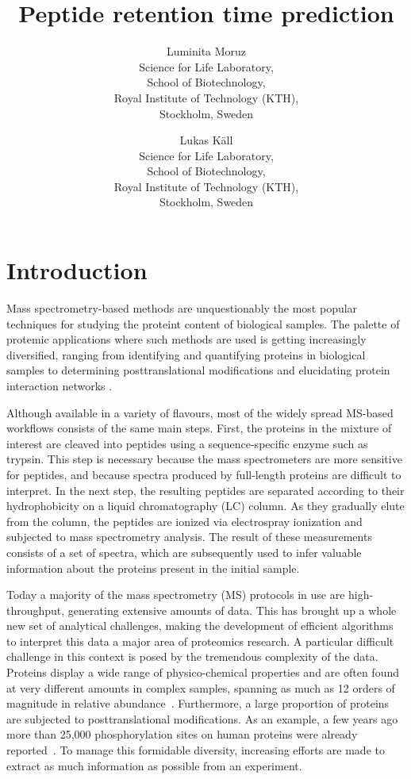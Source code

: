 \documentclass[a4paper]{article}
\title{Peptide retention time prediction}
\author{
Luminita Moruz\\
Science for Life Laboratory,\\
School of Biotechnology,\\
Royal Institute of Technology (KTH),\\
Stockholm, Sweden
\and
Lukas K\"all\\
Science for Life Laboratory,\\
School of Biotechnology,\\
Royal Institute of Technology (KTH),\\
Stockholm, Sweden}
\begin{document}
\maketitle

\setcounter{secnumdepth}{2} %
\setcounter{tocdepth}{2}    %
\tableofcontents            %

\setlength{\parskip}{0.15cm}

\section{Introduction}

Mass spectrometry-based methods are unquestionably the most popular
techniques for studying the proteint content of biological samples.
The palette of protemic applications where such methods are used is
getting increasingly diversified, ranging from identifying and
quantifying proteins in biological samples \cite{Geiger2012} to
determining posttranslational modifications \cite{Huttlin2010} and
elucidating protein interaction networks \cite{Gavin2011}. 


Although available in a variety of flavours, most of the widely spread MS-based workflows consists of the same main steps. First, the proteins in the mixture of interest are cleaved into peptides using a sequence-specific enzyme such as trypsin. This step is necessary because the mass spectrometers are more sensitive for peptides, and because spectra produced by full-length proteins are difficult to interpret. In the next step, the resulting peptides are separated according to their hydrophobicity on a liquid chromatography (LC) column. As they gradually elute from the column, the peptides are ionized via electrospray ionization and subjected to mass spectrometry analysis. The result of these measurements consists of a set of spectra, which are subsequently used to infer valuable information about the proteins present in the initial sample.


Today a majority of the mass spectrometry (MS) protocols in use are
high-throughput, generating extensive amounts of data. This has
brought up a whole new set of analytical challenges, making the
development of efficient algorithms to interpret this data a major
area of proteomics research. A particular difficult challenge in this
context is posed by the tremendous complexity of the data. Proteins
display a wide range of physico-chemical properties and are often
found at very different amounts in complex samples, spanning as much
as 12 orders of magnitude in relative abundance~\cite{Angel2012}.
Furthermore, a large proportion of proteins are subjected to
posttranslational modifications. As an example, a few years ago more
than 25,000 phosphorylation sites on human proteins were already
reported~\cite{Lemeer2009}. To manage this formidable diversity,
increasing efforts are made to extract as much information as possible
from an experiment.
\end{document}
